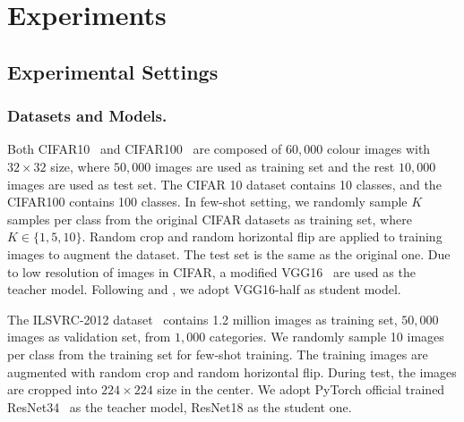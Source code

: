 \documentclass[letterpaper]{article} %
\begin{document}
\section{Experiments}
{
    \subsection{Experimental Settings}
    {
        \subsubsection{Datasets and Models.}
        {
            Both CIFAR10~\cite{krizhevsky2009learning} and CIFAR100~\cite{krizhevsky2009learning} are composed of $60,000$ colour images with $32 \times 32$ size, where $50,000$ images are used as training set and the rest $10,000$ images are used as test set.
            The CIFAR 10 dataset contains 10 classes, and the CIFAR100 contains 100 classes.
            In few-shot setting, we randomly sample $K$ samples per class from the original CIFAR datasets as training set, where $K \in \{1, 5, 10\}$.
            Random crop and random horizontal flip are applied to training images to augment the dataset.
            The test set is the same as the original one.
            Due to low resolution of images in CIFAR, a modified VGG16~\cite{li2016pruning} are used as the teacher model.
            Following \cite{li2018few} and \cite{li2016pruning}, we adopt VGG16-half as student model.

            The ILSVRC-2012 dataset~\cite{ILSVRC15} contains 1.2 million images as training set, $50,000$ images as validation set, from $1,000$ categories. 
            We randomly sample 10 images per class from the training set for few-shot training.
            The training images are augmented with random crop and random horizontal flip.
            During test, the images are cropped into $224 \times 224$ size in the center.
            We adopt PyTorch official trained ResNet34~\cite{he2016deep} 
            as the teacher model, ResNet18 as the student one.

        }

}}
\end{document}
